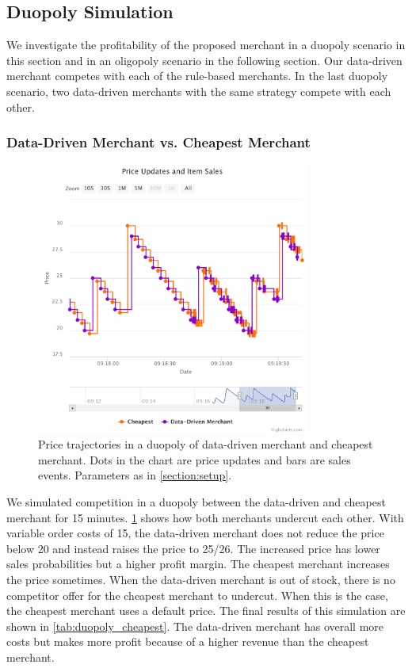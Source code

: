 \subsection{Duopoly Simulation}
\label{section:duopoly}
We investigate the profitability of the proposed merchant in a duopoly scenario in this section and in an oligopoly scenario in the following section.
Our data-driven merchant competes with each of the rule-based merchants.
In the last duopoly scenario, two data-driven merchants with the same strategy compete with each other.

\subsubsection{Data-Driven Merchant vs. Cheapest Merchant}

\begin{figure}[t]
	\centering
	\includegraphics[width=0.8\textwidth]{figures/duopoly_cheapest_prices}
	\caption[Price Trajectories: Data-Driven Merchant versus Cheapest Merchant]{Price trajectories in a duopoly of data-driven merchant and cheapest merchant. Dots in the chart are price updates and bars are sales events. Parameters as in \cref{section:setup}.}
	\label{fig:duopoly_cheapest}
\end{figure}

We simulated competition in a duopoly between the data-driven and cheapest merchant for 15 minutes.
\cref{fig:duopoly_cheapest} shows how both merchants undercut each other.
With variable order costs of 15, the data-driven merchant does not reduce the price below 20 and instead raises the price to 25/26.
The increased price has lower sales probabilities but a higher profit margin.
The cheapest merchant increases the price sometimes.
When the data-driven merchant is out of stock, there is no competitor offer for the cheapest merchant to undercut.
When this is the case, the cheapest merchant uses a default price.
The final results of this simulation are shown in \cref{tab:duopoly_cheapest}.
The data-driven merchant has overall more costs but makes more profit because of a higher revenue than the cheapest merchant.

